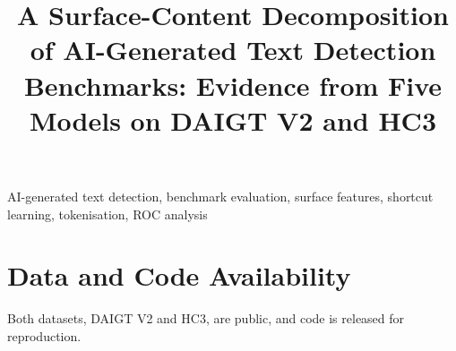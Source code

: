 \documentclass[conference,a4paper]{IEEEtran}
\newif\ifblind
\begin{document}
\title{A Surface-Content Decomposition of AI-Generated Text Detection Benchmarks: Evidence from Five Models on DAIGT V2 and HC3}

\ifblind
  \author{\IEEEauthorblockN{Anonymous Author(s)}
  \IEEEauthorblockA{Affiliation withheld for double-blind review}}
\else
  \author{
  }
\fi

\maketitle

\begin{abstract}

\end{abstract}

\begin{IEEEkeywords}
AI-generated text detection, benchmark evaluation, surface features, shortcut learning, tokenisation, ROC analysis
\end{IEEEkeywords}







\section*{Data and Code Availability}
Both datasets, DAIGT V2 and HC3, are public, and code is released for reproduction.\ifblind{} The link is withheld for blind review.\fi



\end{document}
